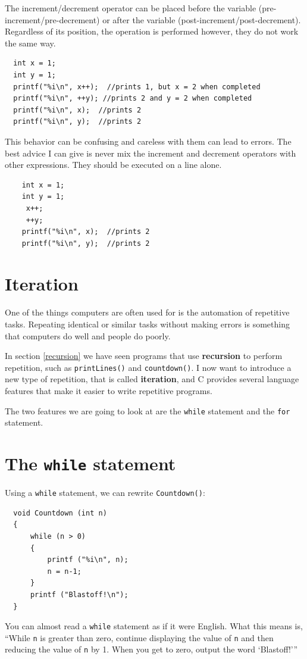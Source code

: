  The increment/decrement operator can be placed before the variable (pre-increment/pre-decrement) or after the variable (post-increment/post-decrement). Regardless of its position, the operation is performed however, they do not work the same way. 
 
  \begin{verbatim}
  int x = 1;
  int y = 1;
  printf("%i\n", x++);  //prints 1, but x = 2 when completed
  printf("%i\n", ++y); //prints 2 and y = 2 when completed
  printf("%i\n", x);  //prints 2
  printf("%i\n", y);  //prints 2
 \end{verbatim}
This behavior can be confusing and careless with them can lead to errors. 
The best advice I can give is never mix the increment and decrement operators with other expressions. 
They should be executed on a line alone.
  \begin{verbatim}
	int x = 1;
	int y = 1;
	 x++;
	 ++y;
	printf("%i\n", x);  //prints 2
	printf("%i\n", y);  //prints 2
\end{verbatim}
%
\section{Iteration}

One of the things computers are often used for is the automation
of repetitive tasks.  Repeating identical or similar tasks without
making errors is something that computers do well and people do
poorly.

In section \ref{recursion} we have seen programs that use {\bf recursion} to perform
repetition, such as {\tt printLines()} and {\tt countdown()}. 
I now want to introduce a new
type of repetition, that is called {\bf iteration}, and C provides
several language features that make it easier to write repetitive
programs.

The two features we are going to look at are the {\tt while}
statement and the {\tt for} statement.

\section{The {\tt while} statement}

Using a {\tt while} statement, we can rewrite {\tt Countdown()}:

\begin{verbatim}
  void Countdown (int n) 
  {
      while (n > 0) 
      {
          printf ("%i\n", n);
          n = n-1;
      }
      printf ("Blastoff!\n");
  }
\end{verbatim}
%
You can almost read a {\tt while} statement as if it were
English.  What this means is, ``While {\tt n} is greater than
zero, continue displaying the value of {\tt n} and then reducing
the value of {\tt n} by 1.  When you get to zero, output the
word `Blastoff!'''

